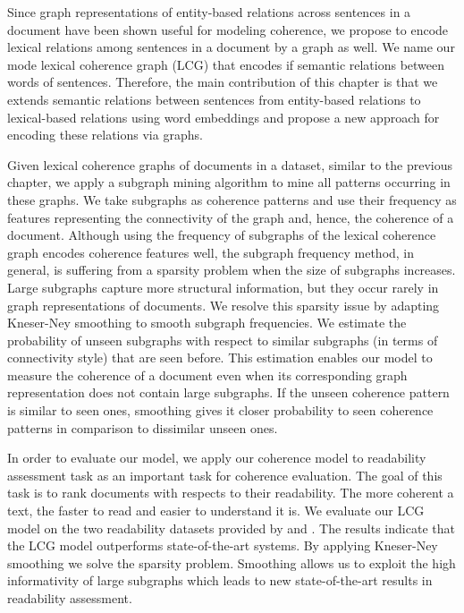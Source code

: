 Since graph representations of entity-based relations across sentences in a document have been shown useful for modeling coherence, we propose to encode lexical relations among sentences in a document by a graph as well. 
We name our mode lexical coherence graph (LCG) that encodes if semantic relations between words of sentences.  
Therefore, the main contribution of this chapter is that we extends semantic relations between sentences from entity-based relations to lexical-based relations using word embeddings and propose a new approach for encoding these relations via graphs. 

Given lexical coherence graphs of documents in a dataset, similar to the previous chapter, we apply a subgraph mining algorithm to mine all patterns occurring in these graphs. 
We take subgraphs as coherence patterns and use their frequency as features representing the connectivity of the graph and, hence, the coherence of a document. 
Although using the frequency of subgraphs of the lexical coherence graph encodes coherence features well, the subgraph frequency method, in general, is suffering from a sparsity problem when the size of subgraphs increases. 
Large subgraphs capture more structural information, but they occur rarely in graph representations of documents.  
We resolve this sparsity issue by adapting \mbox{Kneser-Ney} smoothing \cite{heafield13} to smooth subgraph frequencies. 
We estimate the probability of unseen subgraphs with respect to similar subgraphs (in terms of connectivity style) that are seen before.  
This estimation enables our model to measure the coherence of a document even when its corresponding graph representation does not contain large subgraphs. 
If the unseen coherence pattern is similar to seen ones, smoothing gives it closer
probability to seen coherence patterns in comparison to dissimilar
unseen ones. 


In order to evaluate our model, we apply our coherence model to readability assessment task as an important task for coherence evaluation. 
The goal of this task is to rank documents with respects to their readability. 
The more coherent a text, the faster to read and easier to understand it is. 
We evaluate our LCG model on the two readability datasets provided by  and . 
The results indicate that the LCG model outperforms \mbox{state-of-the-art} systems. 
By applying \mbox{Kneser-Ney} smoothing we solve the sparsity problem. 
Smoothing allows us to exploit the high informativity of large subgraphs which leads to new \mbox{state-of-the-art} results in readability assessment.

